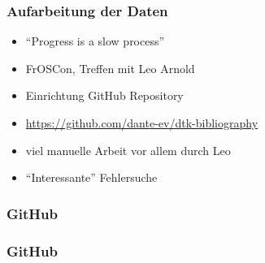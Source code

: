 \documentclass[ngerman]{beamer}
\begin{document}
\begin{frame}
\frametitle{Aufarbeitung der Daten}

\begin{itemize}
\item \enquote{Progress is a slow process}
\item FrOSCon, Treffen mit Leo Arnold
\item Einrichtung GitHub Repository
\item \url{https://github.com/dante-ev/dtk-bibliography}
\item viel manuelle Arbeit vor allem durch Leo
\item \enquote{Interessante} Fehlersuche
\end{itemize}
\end{frame}

\begin{frame}
\frametitle{GitHub}

\begin{center}
\end{center}
\end{frame}

\begin{frame}
\frametitle{GitHub}

\begin{center}
\end{center}
\end{frame}
\end{document}
